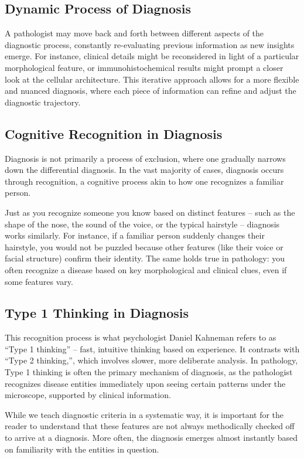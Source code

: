 \subsection{Dynamic Process of Diagnosis}
A pathologist may move back and forth between different aspects of the diagnostic process, constantly re-evaluating previous information as new insights emerge. For instance, clinical details might be reconsidered in light of a particular morphological feature, or immunohistochemical results might prompt a closer look at the cellular architecture. This iterative approach allows for a more flexible and nuanced diagnosis, where each piece of information can refine and adjust the diagnostic trajectory.

\subsection{Cognitive Recognition in Diagnosis}
Diagnosis is not primarily a process of exclusion, where one gradually narrows down the differential diagnosis. In the vast majority of cases, diagnosis occurs through recognition, a cognitive process akin to how one recognizes a familiar person.

Just as you recognize someone you know based on distinct features -- such as the shape of the nose, the sound of the voice, or the typical hairstyle -- diagnosis works similarly. For instance, if a familiar person suddenly changes their hairstyle, you would not be puzzled because other features (like their voice or facial structure) confirm their identity. The same holds true in pathology: you often recognize a disease based on key morphological and clinical clues, even if some features vary.

\subsection{Type 1 Thinking in Diagnosis}
This recognition process is what psychologist Daniel Kahneman refers to as ``Type 1 thinking'' -- fast, intuitive thinking based on experience. It contrasts with ``Type 2 thinking,'', which involves slower, more deliberate analysis. In pathology, Type 1 thinking is often the primary mechanism of diagnosis, as the pathologist recognizes disease entities immediately upon seeing certain patterns under the microscope, supported by clinical information.

While we teach diagnostic criteria in a systematic way, it is important for the reader to understand that these features are not always methodically checked off to arrive at a diagnosis. More often, the diagnosis emerges almost instantly based on familiarity with the entities in question.

